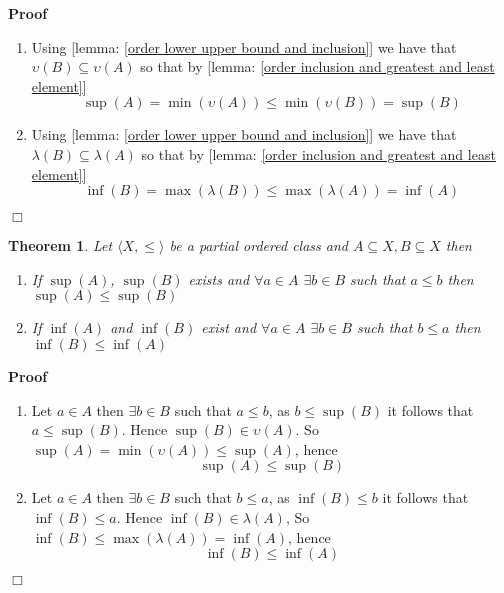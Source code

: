 \documentclass{book}
\newenvironment{proof}{\noindent\textbf{Proof\ }}{\hspace*{\fill}$\Box$\medskip}
\newtheorem{theorem}{Theorem}
\begin{document}
\begin{proof}
  
  \begin{enumerate}
    \item Using [lemma: \ref{order lower upper bound and inclusion}] we have
    that $\upsilon (B) \subseteq \upsilon (A)$ so that by [lemma: \ref{order
    inclusion and greatest and least element}]
    \[ \sup (A) = \min (\upsilon (A)) \leqslant \min (\upsilon (B)) = \sup (B)
    \]
    \item Using [lemma: \ref{order lower upper bound and inclusion}] we have
    that $\lambda (B) \subseteq \lambda (A)$ so that by [lemma: \ref{order
    inclusion and greatest and least element}]
    \[ \inf (B) = \max (\lambda (B)) \leqslant \max (\lambda (A)) = \inf (A)
    \]
  \end{enumerate}
\end{proof}

\begin{theorem}
  \label{order sup and inf and bigger elements}Let $\langle X, \leqslant
  \rangle$ be a partial ordered class and $A \subseteq X, B \subseteq X$ then
  \begin{enumerate}
    \item If $\sup (A)$, $\sup (B)$ exists and $\forall a \in A$ $\exists b
    \in B \text{}$ such that $a \leqslant b$ then $\sup (A) \leqslant \sup
    (B)$
    
    \item If $\inf (A)$ and $\inf (B)$ exist and $\forall a \in A$ $\exists b
    \in B$ such that $b \leqslant a$ then $\inf (B) \leqslant \inf (A)$
  \end{enumerate}
\end{theorem}

\begin{proof}
  
  \begin{enumerate}
    \item Let $a \in A$ then $\exists b \in B$ such that $a \leqslant b$, as
    $b \leqslant \sup (B)$ it follows that $a \leqslant \sup (B)$. Hence $\sup
    (B) \in \upsilon (A)$. So $\sup (A) = \min (\upsilon (A)) \leqslant \sup
    (A)$, hence
    \[ \sup (A) \leqslant \sup (B) \]
    \item Let $a \in A$ then $\exists b \in B$ such that $b \leqslant a$, as
    $\inf (B) \leqslant b$ it follows that $\inf (B) \leqslant a$. Hence $\inf
    (B) \in \lambda (A)$, So $\inf (B) \leqslant \max (\lambda (A)) = \inf
    (A)$, hence
    \[ \inf (B) \leqslant \inf (A) \]
  \end{enumerate}
\end{proof}
\end{document}
